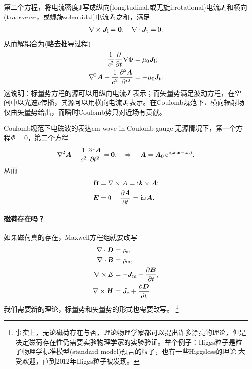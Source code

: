 第二个方程，将电流密度$\bm J$写成纵向(longitudinal,或无旋irrotational)电流$\bm J_\text l$和横向(transverse，或螺旋solenoidal)电流$\bm J_\text t$之和，满足
\[
    \curl\bm J_\text l=\bm 0,\quad\div\bm J_\text t=0.
\]
从而解耦合为(略去推导过程)
\begin{align*}
    \frac1{c^2}\pp t\nabla\Phi&=\mu_0\bm J_\text l;\\
    \lapla\bm A-\frac1{c^2}\pv[2]{\bm A}t&=-\mu_0\bm J_\text t.
\end{align*}
这说明：标量势方程的源可以用纵向电流$\bm J_\text l$表示；而矢量势满足波动方程，在空间中以光速$c$传播，其源可以用横向电流$\bm J_\text t$表示。在Coulomb规范下，横向辐射场仅由矢量势给出，而瞬时Coulomb势只对近场有贡献。

\begin{example}{Coulomb规范下电磁波的表达}{em wave in Coulomb gauge}
    无源情况下，第一个方程$\Phi=0$，第二个方程
    \[
        \lapla\bm A-\frac1{c^2}\pv[2]{\bm A}t=\bm 0,\thus\bm A=\bm A_0\e{\i(\bm k\cdot\bm x-\omega t)}.
    \]
    从而
    \begin{align*}
        \bm B&=\curl\bm A=\i\bm k\times\bm A;\\
        \bm E&=0-\pv{\bm A}t=\i\omega\bm A.
    \end{align*}
\end{example}
\paragraph{磁荷存在吗？}
如果磁荷真的存在，Maxwell方程组就要改写
\begin{align*}
    \div\bm D&=\rho_\elc,\\
    \div\bm B&=\rho_\text m,\\
    \curl\bm E&=-\bm J_\text m-\pv{\bm B}t,\\
    \curl\bm H&=\bm J_\elc+\pv{\bm D}t.
\end{align*}
我们需要新的理论，标量势和矢量势的形式也需要改写。
\footnote{事实上，无论磁荷存在与否，理论物理学家都可以提出许多漂亮的理论，但是决定磁荷存在性仍需要实验物理学家的实验验证。举个例子：Higgs粒子是粒子物理学标准模型(standard model)预言的粒子，也有一些Higgsless的理论
大受欢迎，直到2012年Higgs粒子被发现。}
